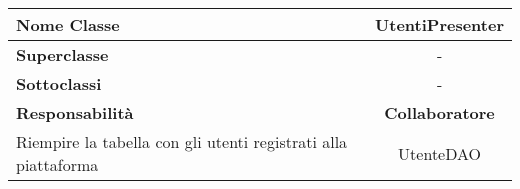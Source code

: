 
\setcounter{table}{0}
\begin{table}[H]
    \centering
    \begin{tabular}{||   l  ||  c   ||}
        \hline
        \rowcolor{Gray}
        \textbf{Nome Classe} & UtentiPresenter\\
        \hline
        \textbf{Superclasse}  &  - \\
        \hline
        \textbf{Sottoclassi} & - \\
        \hline
        \hline
         \textbf{Responsabilità} & \textbf{Collaboratore} \\
         \hline
         Riempire la tabella con gli utenti registrati alla piattaforma & UtenteDAO \\
         \hline
    \end{tabular}
\end{table}

    
       
